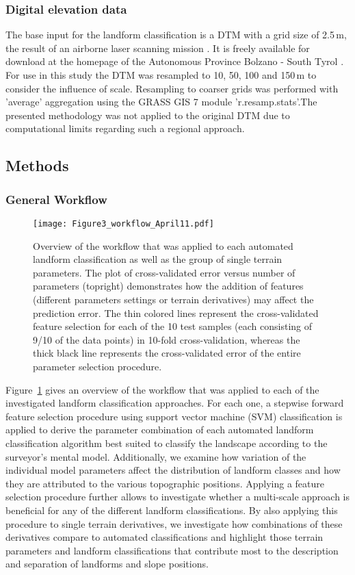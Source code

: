 \documentclass[preprint,12pt,authoryear]{elsarticle}
\begin{document}
\subsubsection{Digital elevation data}
The base input for the landform classification is a DTM with a grid size of 2.5\,m, the result of an airborne laser scanning mission \citep{Wack2005}. It is freely available for download at the homepage of the Autonomous Province Bolzano - South Tyrol \citep{DTM}. For use in this study the DTM was resampled to 10, 50, 100 and 150\,m to consider the influence of scale.  Resampling to coarser grids was performed with 'average' aggregation using the GRASS GIS 7 module 'r.resamp.stats'.The presented methodology was not applied to the original DTM due to computational limits regarding such a regional approach. 
\subsection{Methods}
\subsubsection{General Workflow}
\begin{figure}
\texttt{[image: Figure3\_workflow\_April11.pdf]}
\caption{Overview of the workflow that was applied to each automated landform classification as well as the group of single terrain parameters. The plot of cross-validated error versus number of parameters (topright) demonstrates how the addition of features (different parameters settings or terrain derivatives) may affect the prediction error. The thin colored lines represent the cross-validated feature selection for each of the 10 test samples (each consisting of 9/10 of the data points) in 10-fold cross-validation, whereas the thick black line represents the cross-validated error of the entire parameter selection procedure.}
\label{fig:workflow}
\end{figure}
Figure~\ref{fig:workflow} gives an overview of the workflow that was applied to each of the investigated landform classification approaches. For each one, a stepwise forward feature selection procedure using support vector machine (SVM) classification \cite{Cortes1995} is applied to derive the parameter combination of each automated landform classification algorithm best suited to classify the landscape according to the surveyor's mental model. Additionally, we examine how variation of the individual model parameters affect the distribution of landform classes and how they are attributed to the various topographic positions. Applying a feature selection procedure further allows to investigate whether a multi-scale approach is beneficial for any of the different landform classifications. By also applying this procedure to single terrain derivatives, we investigate how combinations of these derivatives compare to automated classifications and highlight those terrain parameters and landform classifications that contribute most to the description and separation of landforms and slope positions.
\end{document}
